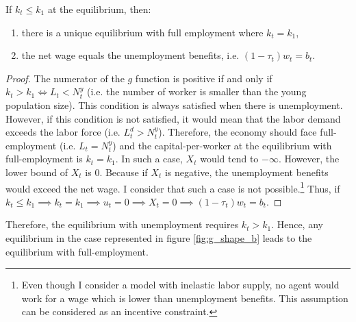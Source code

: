 \begin{proposition}\label{prop:full_emp}
	If $k_t \leq k_1$ at the equilibrium, then:
	\begin{enumerate}[label=(\roman*)]
		\item there is a unique equilibrium with full employment where $k_t = k_1$,
		\item the net wage equals the unemployment benefits, i.e. $(1-\tau_t)w_t = b_t$.
	\end{enumerate} 
\end{proposition}
\begin{proof}
	The numerator of the $g$ function is positive if and only if $k_t > k_1 \Leftrightarrow L_t < N_t^y$ (i.e. the number of worker is smaller than the young population size). This condition is always satisfied when there is unemployment. However, if this condition is not satisfied, it would mean that the labor demand exceeds the labor force (i.e. $L_t^d > N_t^y$). Therefore, the economy should face full-employment (i.e. $L_t = N_t^y$) and the capital-per-worker at the equilibrium with full-employment is $k_t = k_1$. In such a case, $X_t$ would tend to  $-\infty$. However, the lower bound of $X_t$ is $0$. Because if $X_t$ is negative, the unemployment benefits would exceed the net wage. I consider that such a case is not possible.\footnote{Even though I consider a model with inelastic labor supply, no agent would work for a wage which is lower than unemployment benefits. This assumption can be considered as an incentive constraint.} Thus, if $k_t \leq k_1 \implies k_t = k_1 \implies u_t = 0 \implies X_t = 0 \implies (1-\tau_t)w_t = b_t$.
\end{proof}

Therefore, the equilibrium with unemployment requires $k_t > k_1$. Hence, any equilibrium in the case represented in figure \ref{fig:g_shape_b} leads to the equilibrium with full-employment.

